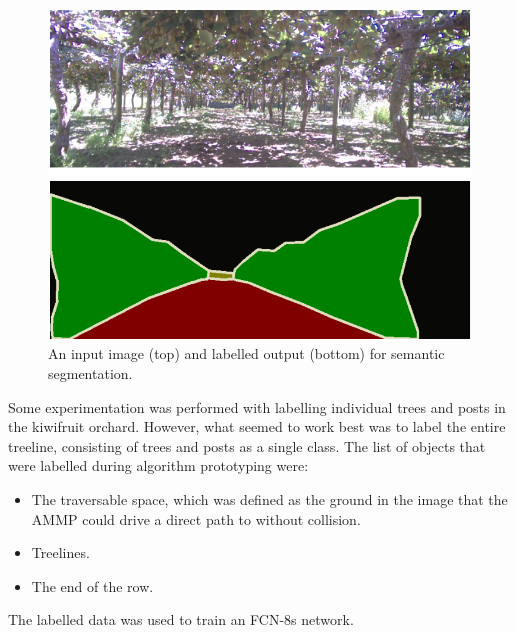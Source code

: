 \documentclass[preprint,authoryear,12pt]{elsarticle}
\begin{document}
    \begin{figure}[htb]
        \centering
        \includegraphics[width=\linewidth]{imgs/photos/segImgLabelPair.png}
        \caption{
            An input image (top) and labelled output (bottom) for semantic segmentation.
        }
        \label{fig:segImgLabelPair}
    \end{figure}

    Some experimentation was performed with labelling individual trees and posts in the kiwifruit orchard. However, what seemed to work best was to label the entire treeline, consisting of trees and posts as a single class. The list of objects that were labelled during algorithm prototyping were:
    \begin{itemize}
    \item The traversable space, which was defined as the ground in the image that the AMMP could drive a direct path to without collision.
    \item Treelines.
    \item The end of the row.
    \end{itemize}

    The labelled data was used to train an FCN-8s network.
\end{document}
